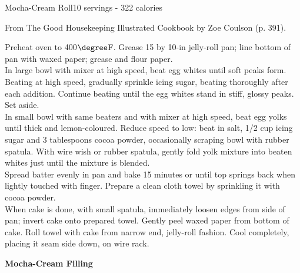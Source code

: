 \begin{recipe}{Mocha-Cream Roll}{10 servings - 322 calories}{}

\freeform From {\normalfont The Good Housekeeping Illustrated Cookbook} by Zoe Coulson (p. 391).


Preheat oven to 400$\degree$F. Grease 15 by 10-in jelly-roll pan; line bottom of pan with waxed paper; grease and flour paper.\\

In large bowl with mixer at high speed, beat egg whites until soft peaks form. Beating at high speed, gradually sprinkle icing sugar, beating thoroughly after each addition. Continue beating until the egg whites stand in stiff, glossy peaks. Set aside.\\

In small bowl with same beaters and with mixer at high speed, beat egg yolks until thick and lemon-coloured. Reduce speed to low: beat in salt, 1/2 cup icing sugar and 3 tablespoons cocoa powder, occasionally scraping bowl with rubber spatula. With wire wish or rubber spatula, gently fold yolk mixture into beaten whites just until the mixture is blended.\\

Spread batter evenly in pan and bake 15 minutes or until top springs back when lightly touched with finger. Prepare a clean cloth towel by sprinkling it with cocoa powder.\\

When cake is done, with small spatula, immediately loosen edges from side of pan; invert cake onto prepared towel. Gently peel waxed paper from bottom of cake. Roll towel with cake from narrow end, jelly-roll fashion. Cool completely, placing it seam side down, on wire rack.\newpage

\textbf{Mocha-Cream Filling}


\end{recipe}
